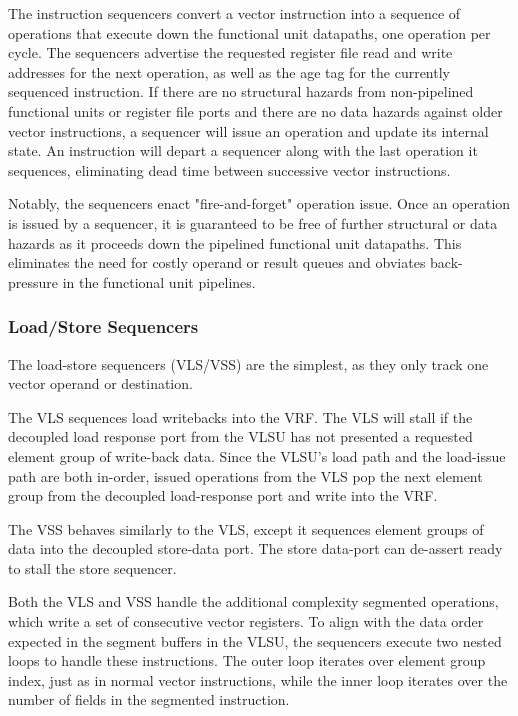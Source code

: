 The instruction sequencers convert a vector instruction into a sequence of operations that execute down the functional unit datapaths, one operation per cycle.
The sequencers advertise the requested register file read and write addresses for the next operation, as well as the age tag for the currently sequenced instruction.
If there are no structural hazards from non-pipelined functional units or register file ports and there are no data hazards against older vector instructions, a sequencer will issue an operation and update its internal state.
An instruction will depart a sequencer along with the last operation it sequences, eliminating dead time between successive vector instructions.

Notably, the sequencers enact "fire-and-forget" operation issue.
Once an operation is issued by a sequencer, it is guaranteed to be free of further structural or data hazards as it proceeds down the pipelined functional unit datapaths.
This eliminates the need for costly operand or result queues and obviates back-pressure in the functional unit pipelines.


\subsubsection{Load/Store Sequencers}

The load-store sequencers (VLS/VSS) are the simplest, as they only track one vector operand or destination.

The VLS sequences load writebacks into the VRF.
The VLS will stall if the decoupled load response port from the VLSU has not presented a requested element group of write-back data.
Since the VLSU's load path and the load-issue path are both in-order, issued operations from the VLS pop the next element group from the decoupled load-response port and write into the VRF.

The VSS behaves similarly to the VLS, except it sequences element groups of data into the decoupled store-data port.
The store data-port can de-assert ready to stall the store sequencer.

Both the VLS and VSS handle the additional complexity segmented operations, which write a set of consecutive vector registers.
To align with the data order expected in the segment buffers in the VLSU, the sequencers execute two nested loops to handle these instructions. The outer loop iterates over element group index, just as in normal vector instructions, while the inner loop iterates over the number of fields in the segmented instruction.


